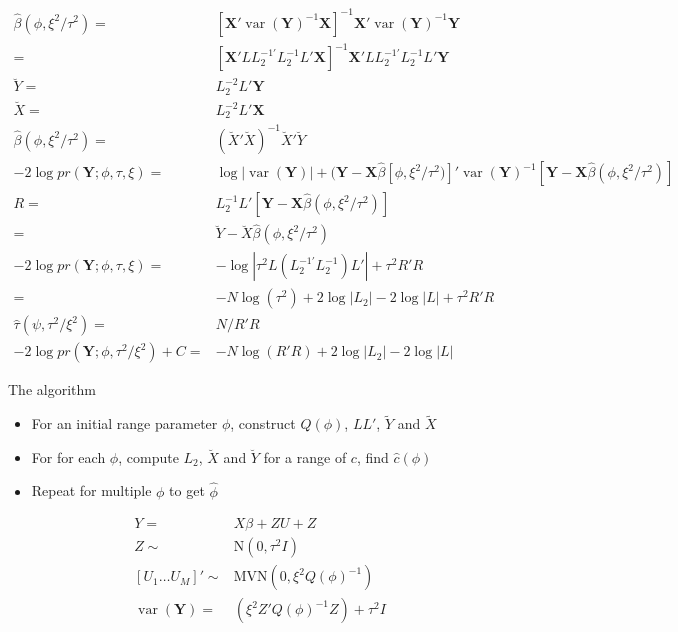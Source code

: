 \documentclass[12pt]{article}
\DeclareMathOperator{\var}{var}
\begin{document}
 
\begin{align*}
\hat\beta(\phi, \xi^2/\tau^2) = &[ \mathbf{X}' 
\var(\mathbf{Y})^{-1}  \mathbf{X}]^{-1}  
\mathbf{X}'\var(\mathbf{Y})^{-1} \mathbf{Y}\\
 = &[ \mathbf{X}' 
  L  L_2^{-1\prime} L_2^{-1}  L'    \mathbf{X}]^{-1}  
\mathbf{X}' L  L_2^{-1\prime} L_2^{-1}   L' \mathbf{Y}
\\
\breve Y =& L_2^{-2} L'  \mathbf{Y}\\
\breve X =& L_2^{-2} L' \mathbf{X}\\
\hat\beta(\phi, \xi^2/\tau^2) = & (\breve X' \breve X)^{-1} \breve X' \breve Y
\\
-2 \log pr(\mathbf{Y};\phi,\tau, \xi) = &
\log |\var(\mathbf{Y})| + ( \mathbf{Y} -\mathbf{X}\hat\beta[\phi, \xi^2/\tau^2) ]  '   
  \var(\mathbf{Y}) ^{-1} 
[\mathbf{Y} - \mathbf{X}\hat\beta(\phi, \xi^2/\tau^2) ] \\
R = & L_2^{-1}   L' [\mathbf{Y} - \mathbf{X}\hat\beta(\phi, \xi^2/\tau^2) ] \\
= & \breve Y - \breve X \hat\beta(\phi, \xi^2/\tau^2) \\
-2 \log pr(\mathbf{Y};\phi,\tau, \xi)  = &  - \log|  \tau^2  L(
L_2^{-1\prime} L_2^{-1} ) L'| +  \tau^2 R'R\\
= & - N \log(\tau^2) + 2\log|L_2| - 2\log|L| +  \tau^2 R'R\\
\hat\tau(\psi, \tau^2/\xi^2) = &  N/R'R \\
-2 \log pr(\mathbf{Y};\phi,\tau^2/\xi^2)+C = & - N \log (R'R)   + 2\log|L_2| -
2\log|L| 
\end{align*}




 


The algorithm
\begin{itemize}
  \item For an initial range parameter $\phi$, construct $Q(\phi)$, $LL'$,
  $\tilde Y$ and $\tilde X$
  \item For for each $\phi$, compute $L_2$, $\breve X$ and $\breve Y$ for a
  range of $c$, find $\hat c(\phi)$
  \item Repeat for multiple $\phi$ to get $\hat \phi$
\end{itemize}


\begin{align*}
Y = & X \beta + Z U + Z\\
Z \sim & \text{N}(0, \tau^2I )\\
[U_1 \ldots U_M]' \sim  & \text{MVN}(0, \xi^2 Q(\phi)^{-1})\\
\var(\mathbf{Y})  = &  ( \xi^2 Z' Q(\phi)^{-1}Z)  + \tau^2 I    \\
\end{align*}
\end{document}

